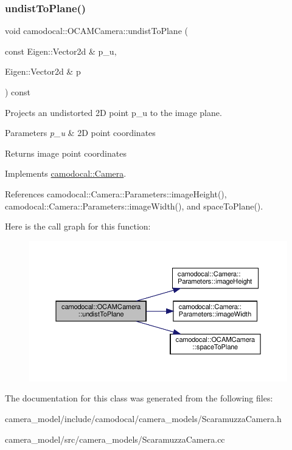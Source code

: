 \subsubsection{\texorpdfstring{undist\+To\+Plane()}{undistToPlane()}}
{\footnotesize\ttfamily void camodocal\+::\+O\+C\+A\+M\+Camera\+::undist\+To\+Plane (\begin{DoxyParamCaption}\item[{const Eigen\+::\+Vector2d \&}]{p\+\_\+u,  }\item[{Eigen\+::\+Vector2d \&}]{p }\end{DoxyParamCaption}) const\hspace{0.3cm}{\ttfamily [virtual]}}



Projects an undistorted 2D point p\+\_\+u to the image plane. 


\begin{DoxyParams}{Parameters}
{\em p\+\_\+u} & 2D point coordinates \\
\hline
\end{DoxyParams}
\begin{DoxyReturn}{Returns}
image point coordinates 
\end{DoxyReturn}


Implements \hyperlink{classcamodocal_1_1Camera}{camodocal\+::\+Camera}.



References camodocal\+::\+Camera\+::\+Parameters\+::image\+Height(), camodocal\+::\+Camera\+::\+Parameters\+::image\+Width(), and space\+To\+Plane().

Here is the call graph for this function\+:\nopagebreak
\begin{figure}[H]
\begin{center}
\leavevmode
\includegraphics[width=350pt]{classcamodocal_1_1OCAMCamera_a804d705efdb76aa606f8cf4feddb2d7a_cgraph}
\end{center}
\end{figure}


The documentation for this class was generated from the following files\+:\begin{DoxyCompactItemize}
\item 
camera\+\_\+model/include/camodocal/camera\+\_\+models/Scaramuzza\+Camera.\+h\item 
camera\+\_\+model/src/camera\+\_\+models/Scaramuzza\+Camera.\+cc\end{DoxyCompactItemize}
